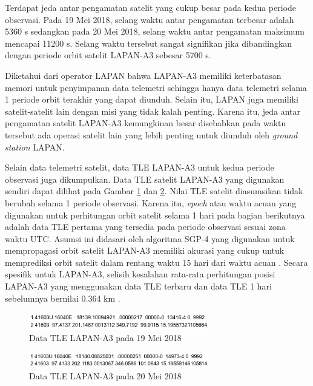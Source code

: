 Terdapat jeda antar pengamatan satelit yang cukup besar pada kedua periode
observasi. Pada 19 Mei 2018, selang waktu antar pengamatan terbesar adalah 5360
s sedangkan pada 20 Mei 2018, selang waktu antar pengamatan maksimum mencapai
11200 s. Selang waktu tersebut sangat signifikan jika dibandingkan dengan
periode orbit satelit LAPAN-A3 sebesar 5700 s. 

Diketahui dari operator LAPAN bahwa LAPAN-A3 memiliki keterbatasan memori untuk
penyimpanan data telemetri sehingga hanya data telemetri selama 1 periode orbit
terakhir yang dapat diunduh. Selain itu, LAPAN juga memiliki satelit-satelit lain
dengan misi yang tidak kalah penting. Karena itu, jeda antar pengamatan satelit
LAPAN-A3 kemungkinan besar disebabkan pada waktu tersebut ada operasi satelit lain
yang lebih penting untuk diunduh oleh \textit{ground station} LAPAN.

Selain data telemetri satelit, data TLE LAPAN-A3 untuk kedua periode observasi
juga dikumpulkan. Data TLE satelit LAPAN-A3 yang digunakan sendiri dapat
dilihat pada Gambar \ref{fig:tlea3_mei19} dan \ref{fig:tlea3_mei20}. Nilai TLE
satelit diasumsikan tidak berubah selama 1 periode observasi. Karena itu,
\textit{epoch} atau waktu acuan yang digunakan untuk perhitungan orbit satelit
selama 1 hari pada bagian berikutnya adalah data TLE pertama yang tersedia pada
periode observasi sesuai zona waktu UTC. Asumsi ini didasari oleh algoritma
SGP-4 yang digunakan untuk mempropagasi orbit satelit LAPAN-A3 memiliki akurasi
yang cukup untuk memprediksi orbit satelit dalam rentang waktu 15 hari dari
waktu acuan \cite{kelsoa}. Secara spesifik untuk LAPAN-A3, selisih kesalahan
rata-rata perhitungan posisi LAPAN-A3 yang menggunakan data TLE terbaru dan
data TLE 1 hari sebelumnya bernilai 0.364 km \cite{nugroho2018}.

\begin{figure}[H]
\setlength{}
\begin{center}
\includegraphics[width=0.7\textwidth]{fig/tlea3_2018-05-19.png}
\caption{Data TLE LAPAN-A3 pada 19 Mei 2018}
\label{fig:tlea3_mei19}
\end{center}
\end{figure}

\begin{figure}[H]
\setlength{}
\begin{center}
\includegraphics[width=0.7\textwidth]{fig/tlea3_2018-05-20.png}
\caption{Data TLE LAPAN-A3 pada 20 Mei 2018}
\label{fig:tlea3_mei20}
\end{center}
\end{figure}


